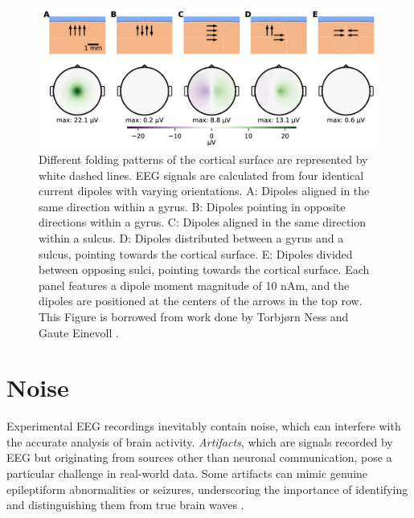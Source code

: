 \documentclass[a4paper, UKenglish, 11pt]{uiomaster}
\begin{document}
\begin{figure}[!htb]
    \centering
    \includegraphics[width=\linewidth]{figures/dipole_orientation.png}
    \caption{Different folding patterns of the cortical surface are represented by white dashed lines. EEG signals are calculated from four identical current dipoles with varying orientations. A: Dipoles aligned in the same direction within a gyrus. B: Dipoles pointing in opposite directions within a gyrus. C: Dipoles aligned in the same direction within a sulcus. D: Dipoles distributed between a gyrus and a sulcus, pointing towards the cortical surface. E: Dipoles divided between opposing sulci, pointing towards the cortical surface.
    Each panel features a dipole moment magnitude of 10 nAm, and the dipoles are positioned at the centers of the arrows in the top row. This Figure is borrowed from work done by Torbjørn Ness and Gaute Einevoll \cite{naess2021biophysically}.}
    \label{fig:dipole_orientation}
\end{figure}




\section{Noise}
Experimental EEG recordings inevitably contain noise, which can interfere with the accurate analysis of brain activity. \emph{Artifacts}, which are signals recorded by EEG but originating from sources other than neuronal communication, pose a particular challenge in real-world data. Some artifacts can mimic genuine epileptiform abnormalities or seizures, underscoring the importance of identifying and distinguishing them from true brain waves \cite{sazgar2019eeg}.
\end{document}
